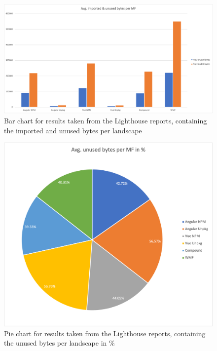 \newpage
\begin{figure}[!h]
	\centering
	\begin{adjustbox}{width=\textwidth,totalheight=\textheight}
		\includegraphics[angle=90]{Figures/avg_unsed_imported_1.png}
	\end{adjustbox}
	\caption{Bar chart for results taken from the Lighthouse reports, containing the imported and unused bytes per landscape}
	\label{fig:appendix_3_3}
\end{figure}
\newpage
\begin{figure}[!h]
	\centering
	\begin{adjustbox}{width=\textwidth,totalheight=\textheight}
		\includegraphics[angle=90]{Figures/avg_unsed_imported_2.png}
	\end{adjustbox}
	\caption{Pie chart for results taken from the Lighthouse reports, containing the unused bytes per landscape in \%}
	\label{fig:appendix_3_4}
\end{figure}